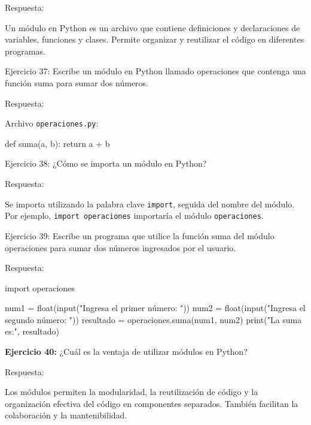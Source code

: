 \documentclass[
  a4paper,
  DIV=11,
  numbers=noendperiod,
  onepage,
  openany]{scrreprt}
\newenvironment{Shaded}{\begin{snugshade}}{\end{snugshade}}
\newcommand{\BuiltInTok}[1]{\textcolor[rgb]{0.00,0.23,0.31}{#1}}
\newcommand{\ControlFlowTok}[1]{\textcolor[rgb]{0.00,0.23,0.31}{#1}}
\newcommand{\ImportTok}[1]{\textcolor[rgb]{0.00,0.46,0.62}{#1}}
\newcommand{\KeywordTok}[1]{\textcolor[rgb]{0.00,0.23,0.31}{#1}}
\newcommand{\NormalTok}[1]{\textcolor[rgb]{0.00,0.23,0.31}{#1}}
\newcommand{\OperatorTok}[1]{\textcolor[rgb]{0.37,0.37,0.37}{#1}}
\newcommand{\StringTok}[1]{\textcolor[rgb]{0.13,0.47,0.30}{#1}}
\begin{document}
Respuesta:

Un módulo en Python es un archivo que contiene definiciones y
declaraciones de variables, funciones y clases. Permite organizar y
reutilizar el código en diferentes programas.

Ejercicio 37: Escribe un módulo en Python llamado operaciones que
contenga una función suma para sumar dos números.

Respuesta:

Archivo \texttt{operaciones.py}:

\begin{Shaded}
\begin{Highlighting}[]
\KeywordTok{def}\NormalTok{ suma(a, b):}
    \ControlFlowTok{return}\NormalTok{ a }\OperatorTok{+}\NormalTok{ b}
\end{Highlighting}
\end{Shaded}

Ejercicio 38: ¿Cómo se importa un módulo en Python?

Respuesta:

Se importa utilizando la palabra clave \texttt{import}, seguida del
nombre del módulo. Por ejemplo, \texttt{import\ operaciones} importaría
el módulo \texttt{operaciones}.

Ejercicio 39: Escribe un programa que utilice la función suma del módulo
operaciones para sumar dos números ingresados por el usuario.

Respuesta:

\begin{Shaded}
\begin{Highlighting}[]
\ImportTok{import}\NormalTok{ operaciones}

\NormalTok{num1 }\OperatorTok{=} \BuiltInTok{float}\NormalTok{(}\BuiltInTok{input}\NormalTok{(}\StringTok{"Ingresa el primer número: "}\NormalTok{))}
\NormalTok{num2 }\OperatorTok{=} \BuiltInTok{float}\NormalTok{(}\BuiltInTok{input}\NormalTok{(}\StringTok{"Ingresa el segundo número: "}\NormalTok{))}
\NormalTok{resultado }\OperatorTok{=}\NormalTok{ operaciones.suma(num1, num2)}
\BuiltInTok{print}\NormalTok{(}\StringTok{"La suma es:"}\NormalTok{, resultado)}
\end{Highlighting}
\end{Shaded}

\textbf{Ejercicio 40:} ¿Cuál es la ventaja de utilizar módulos en
Python?

Respuesta:

Los módulos permiten la modularidad, la reutilización de código y la
organización efectiva del código en componentes separados. También
facilitan la colaboración y la mantenibilidad.
\end{document}
